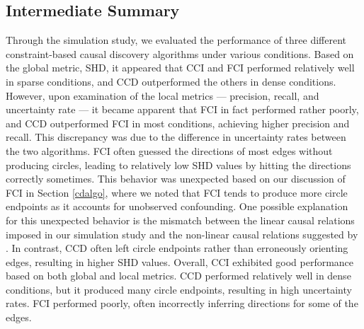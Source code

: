 \documentclass[twoside, 11pt]{article}
\begin{document}
\subsection{Intermediate Summary}
Through the simulation study, we evaluated the performance of three different constraint-based causal discovery algorithms under various conditions. 
Based on the global metric, SHD, it appeared that CCI and FCI performed relatively well in sparse conditions, and CCD outperformed the others in dense conditions. However, upon examination of the local metrics --- precision, recall, and uncertainty rate --- it became apparent that FCI in fact performed rather poorly, and CCD outperformed FCI in most conditions, achieving higher precision and recall. This discrepancy was due to the difference in uncertainty rates between the two algorithms. FCI often guessed the directions of most edges without producing circles, leading to relatively low SHD values by hitting the directions correctly sometimes. 
This behavior was unexpected based on our discussion of FCI in Section \ref{cdalgo}, where we noted that FCI tends to produce more circle endpoints as it accounts for unobserved confounding. One possible explanation for this unexpected behavior is the mismatch between the linear causal relations imposed in our simulation study and the non-linear causal relations suggested by \cite{mooij_classen2020}.
In contrast, CCD often left circle endpoints rather than erroneously orienting edges, resulting in higher SHD values. 
Overall, CCI exhibited good performance based on both global and local metrics. CCD performed relatively well in dense conditions, but it produced many circle endpoints, resulting in high uncertainty rates. FCI performed poorly, often incorrectly inferring directions for some of the edges. 
\end{document}
